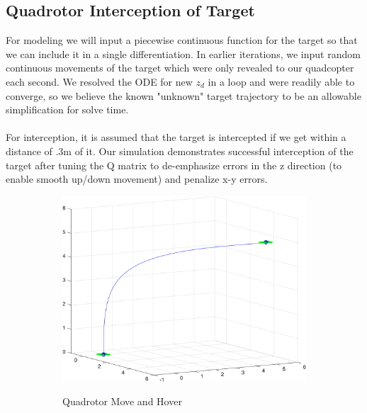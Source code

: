 \documentclass{article}
\begin{document}
\begin{multicols}{2}
\section*{Quadrotor Interception of Target}
For modeling we will input a piecewise continuous function for the target so that we can include it in a single differentiation.  In earlier iterations, we input random continuous movements of the target which were only revealed to our quadcopter each second.  We resolved the ODE for new $z_d$ in a loop and were readily able to converge, so we believe the known "unknown" target trajectory to be an allowable simplification for solve time.\\
\\
For interception, it is assumed that the target is intercepted if we get within a distance of .3m of it.   Our simulation demonstrates successful interception of the target after tuning the Q matrix to de-emphasize errors in the z direction (to enable smooth up/down movement) and penalize x-y errors.  
\begin{figure}[H]
\centering
\begin{subfigure}[b]{0.31\textwidth}
    \centering
    \includegraphics[width = 1\textwidth]{images/MoveAndHover.png}
     \label{fig:MandH}
     \caption{Quadrotor Move and Hover}
\end{subfigure}
\begin{subfigure}[b]{0.31\textwidth}
    \centering

\end{subfigure}
\end{figure}
\end{multicols}
\end{document}
